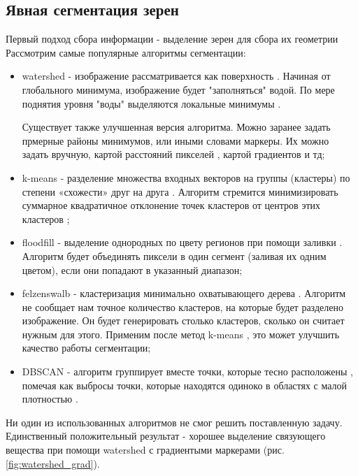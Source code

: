 \documentclass[a4paper, 14pt]{article}
\begin{document}
	\subsection{Явная сегментация зерен}
	
	Первый подход сбора информации - выделение зерен для сбора их геометрии
	Рассмотрим самые популярные алгоритмы сегментации:
	
	\begin{itemize}
		
		\item  watershed - изображение рассматривается 
		как поверхность \cite{habr_watershed}. Начиная от глобального минимума, изображение будет "заполняться"  водой. 
		По мере поднятия уровня "воды" выделяются локальные минимумы .
		
		Существует также улучшенная версия алгоритма.
		Можно заранее задать прмерные районы минимумов, или иными словами маркеры. 
		Их можно задать вручную, картой расстояний пикселей , 
		картой градиентов  и тд;
		
		\item k-means -  разделение множества входных векторов на группы (кластеры)
		по степени «схожести» друг на друга \cite{habr_k-means}. Алгоритм стремится минимизировать суммарное квадратичное отклонение точек кластеров от центров этих кластеров ; 
		
		\item floodfill -  выделение однородных по цвету регионов при помощи заливки \cite{habr_watershed}. Алгоритм будет объединять пиксели в один сегмент (заливая их одним цветом), если они попадают в указанный диапазон;
		
		\item felzenswalb -  кластеризация минимально охватывающего дерева \cite{felz_link}. 
		Алгоритм не сообщает нам точное количество кластеров, на которые будет разделено изображение. Он будет генерировать столько кластеров, сколько он считает нужным для этого. 
		Применим после метод k-means , это может улучшить качество работы сегментации;
		
		\item DBSCAN - алгоритм группирует вместе точки, которые тесно расположены , помечая как выбросы точки, которые находятся одиноко в областях с малой плотностью \cite{dbscan}.
		
		
	\end{itemize}
	
	Ни один из использованных алгоритмов не смог решить поставленную задачу. Единственный положительный результат - хорошее выделение связующего вещества при помощи watershed с градиентыми маркерами (рис. \ref {fig:watershed_grad}).
\end{document}
